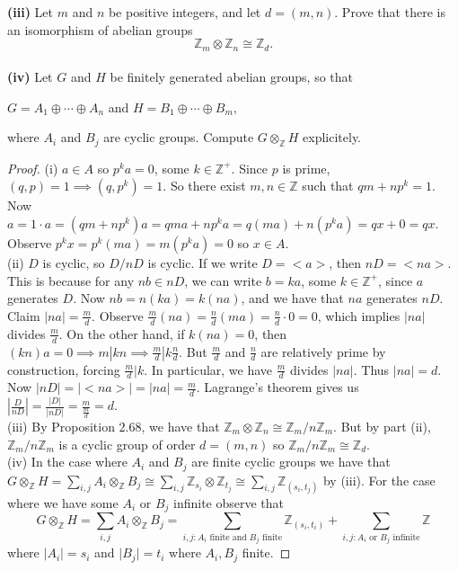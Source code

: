 \documentclass[8pt]{amsart}
\theoremstyle{plain}%
\theoremstyle{definition}
\theoremstyle{remark}
\numberwithin{equation}{section}
\newcommand{\Z}{\mathbb{Z}}
\newcommand{\D}{\displaystyle}
\begin{document}
\indent \textbf{(iii)} Let $m$ and $n$ be positive integers, and let $d =(m,n)$. Prove that there is an isomorphism of abelian groups $$\Z_m \otimes \Z_n \cong \Z_d.$$ \\
\indent \textbf{(iv)} Let $G$ and $H$ be finitely generated abelian groups, so that \\

	\begin{center}
$G=A_1 \oplus \cdots \oplus A_n$ and $H=B_1 \oplus \cdots \oplus B_m,$  \\
	\end{center} 
	
where $A_i$ and $B_j$ are cyclic groups. Compute $G \otimes_{\Z}H$ explicitely. 
\begin{proof}
(i) $a \in A$ so $p^ka=0$, some $k \in \Z^+$. Since $p$ is prime, $(q,p)=1 \implies (q,p^k)=1$. So there exist $m,n \in \Z$ such that $qm+np^k=1$. Now $a=1\cdot a=(qm+np^k)a=qma+np^ka=q(ma)+n(p^ka)=qx+0=qx$. Observe $p^kx=p^k(ma)=m(p^ka)=0$ so $x\in A$.\\

(ii) $D$ is cyclic, so $D/nD$ is cyclic. If we write $D=<a>$, then $nD =<na>$. This is because for any $nb \in nD$, we can write $b=ka$, some $k\in \Z^+$, since $a$ generates $D$. Now $nb=n(ka)=k(na)$, and we have that $na$ generates $nD$. \\

Claim $|na|=\frac{m}{d}$. Observe $\frac{m}{d}(na)=\frac{n}{d}(ma)=\frac{n}{d}\cdot 0=0$, which implies $|na|$ divides $\frac{m}{d}$. On the other hand, if $k(na)=0$, then $(kn)a=0 \implies m|kn \implies \frac{m}{d}|k\frac{n}{d}$. But $\frac{m}{d}$ and $\frac{n}{d}$ are relatively prime by construction, forcing $\frac{m}{d}|k$. In particular, we have $\frac{m}{d}$ divides $|na|$. Thus $|na|=d$. Now $|nD|=|<na>|=|na|=\frac{m}{d}$. Lagrange's theorem gives us $|\frac{D}{nD}|=\frac{|D|}{|nD|}=\frac{m}{\frac{m}{d}}=d$. \\

(iii) By Proposition 2.68, we have that $\Z_m \otimes \Z_n \cong \Z_m/n\Z_m$. But by part (ii), $\Z_m/n\Z_m$ is a cyclic group of order $d=(m,n)$ so $\Z_m/n\Z_m \cong \Z_d$.\\

(iv) In the case where $A_i$ and $B_j$ are finite cyclic groups we have that $G \otimes_\Z H = \D \sum_{i, j} A_i \otimes_\Z B_j \cong \sum_{i, j} \Z_{s_i} \otimes \Z_{t_j} \cong \sum_{i, j} \Z_{(s_i, t_j)}$ by (iii). For the case where we have some $A_i$ or $B_j$ infinite observe that $$G \otimes_\Z H = \D \sum_{i, j} A_i \otimes_\Z B_j = \sum_{i, j : A_i \text{ finite and } B_j \text{ finite}} \Z_{(s_i, t_i)} + \sum_{i, j : A_i \text{ or } B_j \text{ infinite}}\Z$$ where $\vert A_i \vert = s_i$ and $\vert B_j \vert = t_i$ where $A_i, B_j$ finite.

\end{proof}
\end{document}
